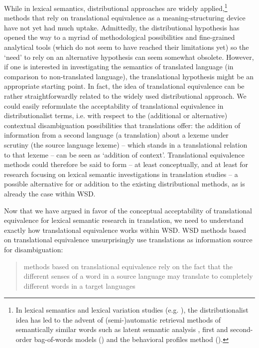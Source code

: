 While in lexical semantics, distributional approaches are widely applied,\footnote{In lexical semantics and lexical variation studies (e.g. \citealt{peirsman_automatic_2010}), the distributionalist idea has led to the advent of (semi-)automatic retrieval methods of semantically similar words such as latent semantic analysis \citep{landauer_solution_1997}, first and second-order bag-of-words models (\citealt{manning_foundations_1999}) and the behavioral profiles method (\citealt{divjak_ways_2006, evans_behavioral_2009}).} methods that rely on translational equivalence as a meaning-structuring device have not yet had much uptake. Admittedly, the distributional hypothesis has opened the way to a myriad of methodological possibilities and fine-grained analytical tools (which do not seem to have reached their limitations yet) so the ‘need’ to rely on an alternative hypothesis can seem somewhat obsolete. However, if one is interested in investigating the semantics of translated language (in comparison to non-translated language), the translational hypothesis might be an appropriate starting point. In fact, the idea of translational equivalence can be rather straightforwardly related to the widely used distributional approach. We could easily reformulate the acceptability of translational equivalence in distributionalist terms, i.e. with respect to the (additional or alternative) contextual disambiguation possibilities that translations offer: the addition of information from a second language (a translation) about a lexeme under scrutiny (the source language lexeme) – which stands in a translational relation to that lexeme – can be seen as ‘addition of context’. Translational equivalence methods could therefore be said to form – at least conceptually, and at least for research focusing on lexical semantic investigations in translation studies – a possible alternative for or addition to the existing distributional methods, as is already the case within WSD.

Now that we have argued in favor of the conceptual acceptability of translational equivalence for lexical semantic research in translation, we need to understand exactly how translational equivalence works within WSD. WSD methods based on translational equivalence unsurprisingly use translations as information source for disambiguation:

\begin{quote}
methods based on translational equivalence rely on the fact that the different senses of a word in a source language may translate to completely different words in a target languages \citep[134]{agirre_unsupervised_2007}
\end{quote}

